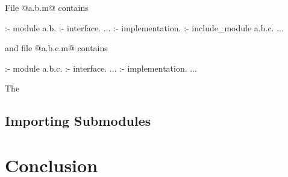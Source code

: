 File @a.b.m@ contains
\begin{myverbatim}
:- module a.b.
:- interface.
...
:- implementation.
:- include_module a.b.c.
...
\end{myverbatim}
and file @a.b.c.m@ contains
\begin{myverbatim}
:- module a.b.c.
:- interface.
...
:- implementation.
...
\end{myverbatim}
The 


\subsection{Importing Submodules}



\section{Conclusion}

